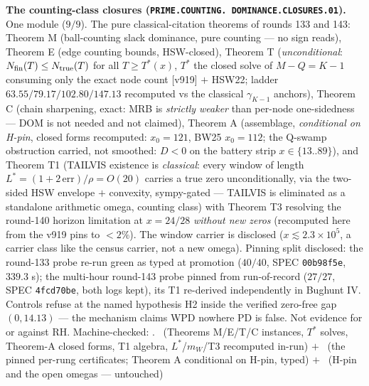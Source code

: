 \par\smallskip\noindent\textbf{The counting-class closures
(\texttt{PRIME.\allowbreak COUNTING.\allowbreak
DOMINANCE.\allowbreak CLOSURES.01}).}
One module ($9/9$).  The pure classical-citation theorems of
rounds 133 and 143: Theorem M (ball-counting slack dominance,
pure counting --- no sign reads), Theorem E (edge counting
bounds, HSW-closed), Theorem T (\emph{unconditional}:
$N_{\rm fin}(T) \le N_{\rm true}(T)$ for all $T \ge T^*(x)$,
$T^*$ the closed solve of $M - Q = K - 1$ consuming only the
exact node count [v919] $+$ HSW22; ladder
$63.55/79.17/102.80/147.13$ recomputed vs the classical
$\gamma_{K-1}$ anchors), Theorem C (chain sharpening, exact:
MRB is \emph{strictly weaker} than per-node one-sidedness ---
DOM is not needed and not claimed), Theorem A (assemblage,
\emph{conditional on H-pin}, closed forms recomputed: $x_0 =
121$, BW25 $x_0 = 112$; the Q-swamp obstruction carried, not
smoothed: $D < 0$ on the battery strip $x \in \{13..89\}$), and
Theorem T1 (TAILVIS existence is \emph{classical}: every window
of length $L^* = (1 + 2\,\mathrm{err})/\rho = O(20)$ carries a
true zero unconditionally, via the two-sided HSW envelope $+$
convexity, sympy-gated --- TAILVIS is eliminated as a standalone
arithmetic omega, counting class) with Theorem T3 resolving the
round-140 horizon limitation at $x = 24/28$ \emph{without new
zeros} (recomputed here from the v919 pins to $< 2\%$).  The
window carrier is disclosed ($x \lesssim 2.3\times10^5$, a
carrier class like the census carrier, not a new omega).
Pinning split disclosed: the round-133 probe re-run green as
typed at promotion ($40/40$, SPEC \texttt{00b98f5e}, $339.3$ s);
the multi-hour round-143 probe pinned from run-of-record
($27/27$, SPEC \texttt{4fcd70be}, both logs kept), its T1
re-derived independently in Bughunt IV.  Controls refuse at the
named hypothesis H2 inside the verified zero-free gap
$(0, 14.13)$ --- the mechanism claims WPD nowhere PD is false.
Not evidence for or against RH.
Machine-checked: .
\mE\ (Theorems M/E/T/C instances, $T^*$ solves, Theorem-A closed
forms, T1 algebra, $L^*$/$m_W$/T3 recomputed in-run) $+$ \mC\
(the pinned per-rung certificates; Theorem A conditional on
H-pin, typed) $+$ \mO\ (H-pin and the open omegas --- untouched)
\par\smallskip


